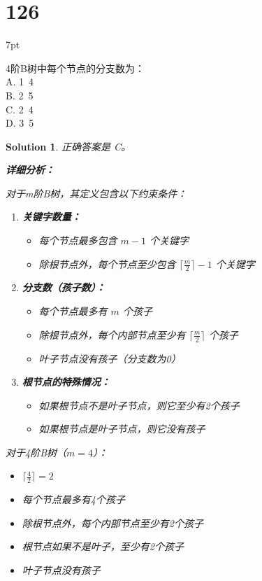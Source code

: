 \documentclass[UTF8]{report}
\newtheorem{solution}{Solution}
\theoremstyle{MyLineTheoremStyle} %
\theoremstyle{MyBlockTheoremStyle} %
\theoremstyle{MySubsubsectionStyle} %
\newenvironment{graybox}{%
        \def\FrameCommand{%
        \hspace{1pt}%
        {\color{gray}\small \vrule width 2pt}%
        {\color{graybox_color}\vrule width 4pt}%
        \colorbox{graybox_color}%
        }%
        \MakeFramed{\advance\hsize-\width\FrameRestore}%
        \noindent\hspace{-4.55pt}%
        \begin{adjustwidth}{}{7pt}%
        \vspace{2pt}\vspace{2pt}%
        }
        {%
        \vspace{2pt}\end{adjustwidth}\endMakeFramed%
        }
\begin{document}
\section*{126}
\begin{graybox}
4阶B树中每个节点的分支数为：\\
A. 1~4\\
B. 2~5\\
C. 2~4\\
D. 3~5
\end{graybox}
\begin{solution}
正确答案是 C。

\textbf{详细分析：}

对于m阶B树，其定义包含以下约束条件：

\begin{enumerate}
    \item \textbf{关键字数量：}
    \begin{itemize}
        \item 每个节点最多包含 $m-1$ 个关键字
        \item 除根节点外，每个节点至少包含 $\lceil \frac{m}{2} \rceil - 1$ 个关键字
    \end{itemize}

    \item \textbf{分支数（孩子数）：}
    \begin{itemize}
        \item 每个节点最多有 $m$ 个孩子
        \item 除根节点外，每个内部节点至少有 $\lceil \frac{m}{2} \rceil$ 个孩子
        \item 叶子节点没有孩子（分支数为0）
    \end{itemize}

    \item \textbf{根节点的特殊情况：}
    \begin{itemize}
        \item 如果根节点不是叶子节点，则它至少有2个孩子
        \item 如果根节点是叶子节点，则它没有孩子
    \end{itemize}
\end{enumerate}

对于4阶B树（$m = 4$）：
\begin{itemize}
    \item $\lceil \frac{4}{2} \rceil = 2$
    \item 每个节点最多有4个孩子
    \item 除根节点外，每个内部节点至少有2个孩子
    \item 根节点如果不是叶子，至少有2个孩子
    \item 叶子节点没有孩子
\end{itemize}


\end{solution}
\end{document}
